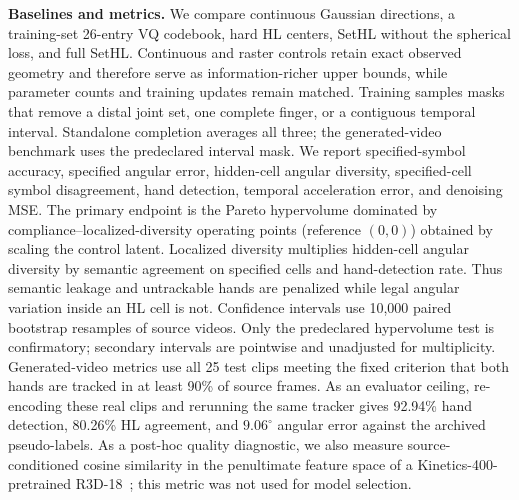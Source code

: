 \documentclass{article}
\begin{document}
\textbf{Baselines and metrics.}
We compare continuous Gaussian directions, a training-set 26-entry VQ
codebook, hard HL centers, SetHL without the spherical loss, and full SetHL.
Continuous and raster controls retain exact observed geometry and therefore
serve as information-richer upper bounds, while parameter counts and training
updates remain matched.
Training samples masks that remove a distal joint set, one complete finger, or
a contiguous temporal interval.  Standalone completion averages all three;
the generated-video benchmark uses the predeclared interval mask. We report
specified-symbol accuracy, specified angular error,
hidden-cell angular diversity, specified-cell symbol disagreement, hand
detection, temporal acceleration error, and denoising MSE. The primary endpoint
is the Pareto hypervolume dominated by compliance--localized-diversity operating
points (reference $(0,0)$) obtained by scaling the control latent. Localized
diversity multiplies hidden-cell angular diversity by semantic agreement on
specified cells and hand-detection rate. Thus semantic leakage and untrackable
hands are penalized while legal angular variation inside an HL cell is not.
Confidence intervals use 10,000 paired bootstrap resamples of source videos.
Only the predeclared hypervolume test is confirmatory; secondary intervals are
pointwise and unadjusted for multiplicity.
Generated-video metrics use all 25 test clips meeting the fixed criterion
that both hands are tracked in at least 90\% of source frames.
As an evaluator ceiling, re-encoding these real clips and rerunning the same
tracker gives 92.94\% hand detection, 80.26\% HL agreement, and
$9.06^\circ$ angular error against the archived pseudo-labels.
As a post-hoc quality diagnostic, we also measure source-conditioned cosine
similarity in the penultimate feature space of a Kinetics-400-pretrained
R3D-18~\cite{r3d}; this metric was not used for model selection.
\end{document}
